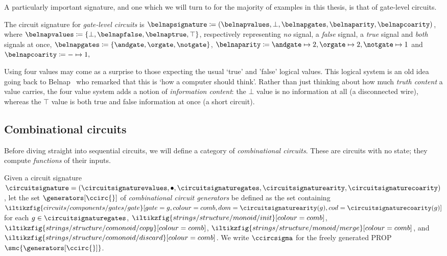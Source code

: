 \documentclass{lmcs}
\begin{document}
A particularly important signature, and one which we will turn to for the
majority of examples in this thesis, is that of gate-level circuits.

\begin{exa}\label{ex:belnap-signature}
    The circuit signature for \emph{gate-level circuits} is \(
    \belnapsignature \coloneqq (
    \belnapvalues,
    \bot,
    \belnapgates,
    \belnaparity,
    \belnapcoarity
    )\), where \(
    \belnapvalues \coloneqq \{\bot, \belnapfalse, \belnaptrue, \top\}
    \), respectively representing \emph{no} signal, a \emph{false} signal, a
    \emph{true} signal and \emph{both} signals at once, \(
    \belnapgates \coloneqq \{\andgate,\orgate,\notgate\}
    \), \(
    \belnaparity \coloneqq
    \andgate \mapsto 2,
    \orgate \mapsto 2,
    \notgate \mapsto 1
    \) and \(
    \belnapcoarity \coloneqq - \mapsto 1,
    \)
\end{exa}

\begin{rem}
    Using four values may come as a surprise to those expecting the usual
    `true' and 'false' logical values.
    This logical system is an old idea going back to
    Belnap~\cite{belnap1977useful} who remarked that this is `how a computer
    should think'.
    Rather than just thinking about how much \emph{truth content} a value
    carries, the four value system adds a notion of \emph{information content}:
    the \(\bot\) value is no information at all (a disconnected wire), whereas
    the \(\top\) value is both true and false information at once
    (a short circuit).
\end{rem}

\subsection{Combinational circuits}

Before diving straight into sequential circuits, we will define a category of
\emph{combinational circuits}.
These are circuits with no state; they compute \emph{functions} of their inputs.

\begin{defi}
    Given a circuit signature \(
    \circuitsignature = (
    \circuitsignaturevalues,
    \bullet,
    \circuitsignaturegates,
    \circuitsignaturearity,
    \circuitsignaturecoarity
    )
    \), let the set \(\generators[\ccirc{}]\) of
    \emph{combinational circuit generators} be defined as the set containing \(
    \iltikzfig{circuits/components/gates/gate}[gate=g,colour=comb,dom=\circuitsignaturearity(g),cod=\circuitsignaturecoarity(g)]
    \) for each \(g \in \circuitsignaturegates\),
    \(\iltikzfig{strings/structure/monoid/init}[colour=comb]\),
    \(\iltikzfig{strings/structure/comonoid/copy}[colour=comb]\),
    \(\iltikzfig{strings/structure/monoid/merge}[colour=comb]\), and
    \(\iltikzfig{strings/structure/comonoid/discard}[colour=comb]\).
    We write \(\ccircsigma\) for the freely generated PROP
    \(\smc{\generators[\ccirc{}]}\).
\end{defi}
\end{document}
